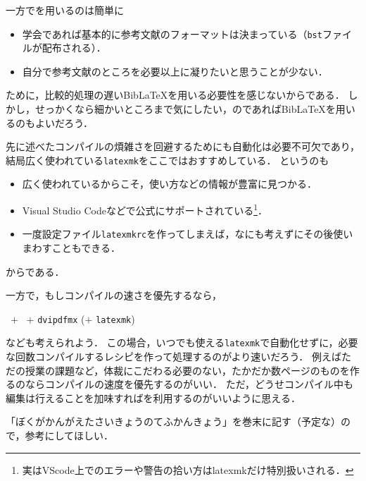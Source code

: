 \documentclass[./main]{subfiles}
\begin{document}
一方で\upBibTeX を用いるのは簡単に
\begin{itemize}
  \item 学会であれば基本的に参考文献のフォーマットは決まっている（\verb|bst|ファイルが配布される）．
  \item 自分で参考文献のところを必要以上に凝りたいと思うことが少ない．
\end{itemize}
ために，比較的処理の遅いBib\LaTeX を用いる必要性を感じないからである．
しかし，せっかくなら細かいところまで気にしたい，のであればBib\LaTeX を用いるのもよいだろう．

先に述べたコンパイルの煩雑さを回避するためにも自動化は必要不可欠であり，結局広く使われている\verb|latexmk|をここではおすすめしている．
というのも
\begin{itemize}
  \item 広く使われているからこそ，使い方などの情報が豊富に見つかる．
  \item Visual Studio Codeなどで公式にサポートされている\footnote{実はVScode上でのエラーや警告の拾い方はlatexmkだけ特別扱いされる\supercite{llmk_Workshop}．}．
  \item 一度設定ファイル\verb|latexmkrc|を作ってしまえば，なにも考えずにその後使いまわすこともできる．
\end{itemize}
からである．

一方で，もしコンパイルの速さを優先するなら，
\begin{screen}
  \centering
  \upLaTeX\ $+$ \upBibTeX\ $+$ \verb|dvipdfmx| ($+$ \verb|latexmk|)
\end{screen}
なども考えられよう．
この場合，いつでも使える\verb|latexmk|で自動化せずに，必要な回数コンパイルするレシピを作って処理するのがより速いだろう．
例えばただの授業の課題など，体裁にこだわる必要のない，たかだか数ページのものを作るのならコンパイルの速度を優先するのがいい．
ただ，どうせコンパイル中も編集は行えることを加味すれば\LuaLaTeX を利用するのがいいように思える．

「ぼくがかんがえたさいきょうのてふかんきょう」を巻末に記す（予定な）ので，参考にしてほしい．

\ifSubfilesClassLoaded{%
  \printbibliography
}%
\end{document}
